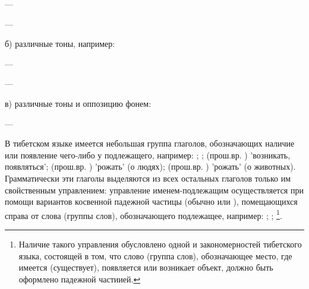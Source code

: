 \begin{description}
	\item{} --- 
	\item{} --- 
\end{description}

б) различные тоны, например:

\begin{description}
	\item{} --- 
	\item{} --- 
\end{description}

в) различные тоны и оппозицию фонем:

\begin{description}
	\item{} --- 
\end{description}

В тибетском языке имеется небольшая группа глаголов,
обозначающих наличие или появление чего-либо у подлежащего, например:
;
;
 (прош.вр. ) 'возникать, появляться';
 (прош.вр. ) 'рожать' (о людях);
 (прош.вр. ) 'рожать' (о животных).
Грамматически эти глаголы выделяются из всех остальных глаголов только им свойственным управлением: управление именем-подлежащим осуществляется при помощи вариантов косвенной падежной частицы (обычно  или ), помещающихся справа от слова (группы слов), обозначающего подлежащее, например:
;
;
\footnote[34]{Наличие такого управления обусловлено одной и закономерностей тибетского языка, состоящей в том, что слово (группа слов), обозначающее место, где имеется (существует), появляется или возникает объект, должно быть оформлено падежной частиией.}.

